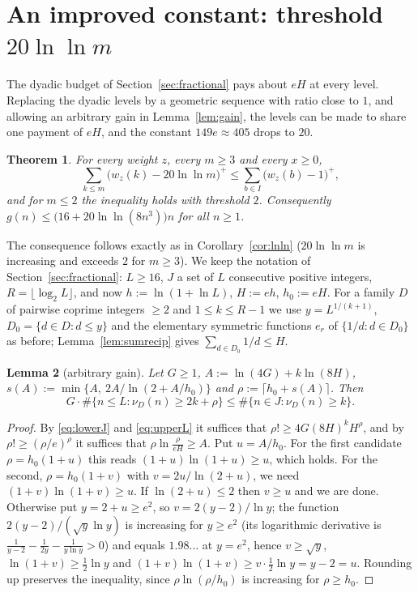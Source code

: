 \documentclass[11pt]{article}
\newtheorem{theorem}{Theorem}[section]
\newtheorem{lemma}[theorem]{Lemma}
\theoremstyle{definition}
\begin{document}
\section{An improved constant: threshold $20\ln\ln m$}\label{sec:constant}

The dyadic budget of Section~\ref{sec:fractional} pays about $eH$ at every level. Replacing the dyadic levels by a
geometric sequence with ratio close to $1$, and allowing an arbitrary gain in Lemma~\ref{lem:gain}, the levels can be
made to share one payment of $eH$, and the constant $149e\approx405$ drops to $20$.

\begin{theorem}\label{thm:twenty}
For every weight $z$, every $m\ge3$ and every $x\ge0$,
\begin{equation}\label{eq:th20}
\sum_{k\le m}\bigl(w_z(k)-20\ln\ln m\bigr)^+\le\sum_{b\in I}\bigl(w_z(b)-1\bigr)^+ ,
\end{equation}
and for $m\le2$ the inequality holds with threshold $2$. Consequently $g(n)\le\bigl(16+20\ln\ln(8n^3)\bigr)n$ for all $n\ge1$.
\end{theorem}

The consequence follows exactly as in Corollary~\ref{cor:lnln} ($20\ln\ln m$ is increasing and exceeds $2$ for $m\ge3$).
We keep the notation of Section~\ref{sec:fractional}: $L\ge16$, $J$ a set of $L$ consecutive positive integers,
$R=\lfloor\log_2L\rfloor$, and now $h:=\ln(1+\ln L)$, $H:=eh$, $h_0:=eH$. For a family $D$ of pairwise coprime integers $\ge2$
and $1\le k\le R-1$ we use $y=L^{1/(k+1)}$, $D_0=\{d\in D:d\le y\}$ and the elementary symmetric functions $e_r$ of $\{1/d:d\in D_0\}$
as before; Lemma~\ref{lem:sumrecip} gives $\sum_{d\in D_0}1/d\le H$.

\begin{lemma}[arbitrary gain]\label{lem:anyG}
Let $G\ge1$, $A:=\ln(4G)+k\ln(8H)$, $s(A):=\min\{A,\ 2A/\ln(2+A/h_0)\}$ and $\rho:=\lceil h_0+s(A)\rceil$. Then
\[
G\cdot\#\{n\le L:\nu_D(n)\ge2k+\rho\}\le\#\{n\in J:\nu_D(n)\ge k\}.
\]
\end{lemma}
\begin{proof}
By \eqref{eq:lowerJ} and \eqref{eq:upperL} it suffices that $\rho!\ge4G(8H)^kH^\rho$, and by $\rho!\ge(\rho/e)^\rho$ it suffices
that $\rho\ln\frac{\rho}{eH}\ge A$. Put $u=A/h_0$. For the first candidate $\rho=h_0(1+u)$ this reads $(1+u)\ln(1+u)\ge u$, which
holds. For the second, $\rho=h_0(1+v)$ with $v=2u/\ln(2+u)$, we need $(1+v)\ln(1+v)\ge u$. If $\ln(2+u)\le2$ then $v\ge u$
and we are done. Otherwise put $y=2+u\ge e^2$, so $v=2(y-2)/\ln y$; the function $2(y-2)/(\sqrt y\ln y)$ is increasing for
$y\ge e^2$ (its logarithmic derivative is $\frac1{y-2}-\frac1{2y}-\frac1{y\ln y}>0$) and equals $1.98\ldots$ at $y=e^2$, hence
$v\ge\sqrt y$, $\ln(1+v)\ge\tfrac12\ln y$ and $(1+v)\ln(1+v)\ge v\cdot\tfrac12\ln y=y-2=u$. Rounding up preserves the
inequality, since $\rho\ln(\rho/h_0)$ is increasing for $\rho\ge h_0$.
\end{proof}
\end{document}
